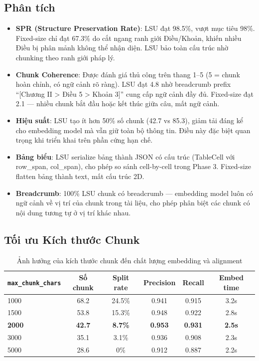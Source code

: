 \subsection{Phân tích}

\begin{itemize}
    \item \textbf{SPR (Structure Preservation Rate)}: LSU đạt 98.5\%, vượt mục tiêu 98\%. Fixed-size chỉ đạt 67.3\% do cắt ngang ranh giới Điều/Khoản, khiến nhiều Điều bị phân mảnh không thể nhận diện. LSU bảo toàn cấu trúc nhờ chunking theo ranh giới pháp lý.

    \item \textbf{Chunk Coherence}: Được đánh giá thủ công trên thang 1--5 (5 = chunk hoàn chỉnh, có ngữ cảnh rõ ràng). LSU đạt 4.8 nhờ breadcrumb prefix ``[Chương II > Điều 5 > Khoản 3]'' cung cấp ngữ cảnh đầy đủ. Fixed-size đạt 2.1 — nhiều chunk bắt đầu hoặc kết thúc giữa câu, mất ngữ cảnh.

    \item \textbf{Hiệu suất}: LSU tạo ít hơn 50\% số chunk (42.7 vs 85.3), giảm tải đáng kể cho embedding model mà vẫn giữ toàn bộ thông tin. Điều này đặc biệt quan trọng khi triển khai trên phần cứng hạn chế.

    \item \textbf{Bảng biểu}: LSU serialize bảng thành JSON có cấu trúc (TableCell với row\_span, col\_span), cho phép so sánh cell-by-cell trong Phase 3. Fixed-size flatten bảng thành text, mất cấu trúc 2D.

    \item \textbf{Breadcrumb}: 100\% LSU chunk có breadcrumb — embedding model luôn có ngữ cảnh về vị trí của chunk trong tài liệu, cho phép phân biệt các chunk có nội dung tương tự ở vị trí khác nhau.
\end{itemize}

\subsection{Tối ưu Kích thước Chunk}

\begin{table}[H]
    \centering
    \caption{Ảnh hưởng của kích thước chunk đến chất lượng embedding và alignment}
    \label{tab:chunk_size_ablation}
    \begin{tabularx}{\textwidth}{X c c c c c}
        \toprule
        \texttt{max\_chunk\_chars} & \textbf{Số chunk} & \textbf{Split rate} & \textbf{Precision} & \textbf{Recall} & \textbf{Embed time}\\
        \midrule
        1000 & 68.2 & 24.5\% & 0.941 & 0.915 & 3.2s\\
        1500 & 53.8 & 15.3\% & 0.948 & 0.922 & 2.8s\\
        \textbf{2000} & \textbf{42.7} & \textbf{8.7\%} & \textbf{0.953} & \textbf{0.931} & \textbf{2.5s}\\
        3000 & 35.1 & 3.1\% & 0.936 & 0.908 & 2.3s\\
        5000 & 28.6 & 0\% & 0.912 & 0.887 & 2.2s\\
        \bottomrule
    \end{tabularx}
\end{table}

